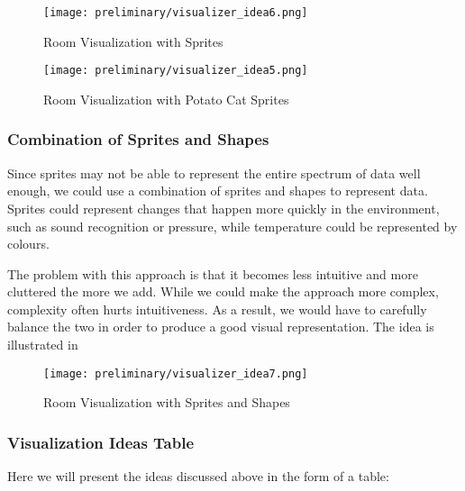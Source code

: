 \documentclass[../document]{subfiles}
\begin{document}
\begin{figure}[H]
	\texttt{[image: preliminary/visualizer\_idea6.png]}
	\caption{Room Visualization with Sprites}
	\label{fig:visualizer_idea6}
\end{figure}

\begin{figure}[H]
	\texttt{[image: preliminary/visualizer\_idea5.png]}
	\caption{Room Visualization with Potato Cat Sprites}
	\label{fig:visualizer_idea5}
\end{figure}

\subsubsection{Combination of Sprites and Shapes}

Since sprites may not be able to represent the entire spectrum of data well enough, we could use a combination of sprites and shapes to represent data. Sprites could represent changes that happen more quickly in the environment, such as sound recognition or pressure, while temperature could be represented by colours.

The problem with this approach is that it becomes less intuitive and more cluttered the more we add. While we could make the approach more complex, complexity often hurts intuitiveness. As a result, we would have to carefully balance the two in order to produce a good visual representation. The idea is illustrated in 

\begin{figure}[H]
\texttt{[image: preliminary/visualizer\_idea7.png]}
\caption{Room Visualization with Sprites and Shapes}
\label{fig:visualizer_idea7}
\end{figure}

\subsubsection{Visualization Ideas Table}
Here we will present the ideas discussed above in the form of a table:
\end{document}
